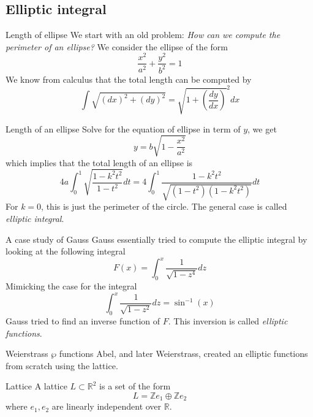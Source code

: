 \documentclass[pdf]{beamer}
\begin{document}
\subsection{Elliptic integral}
\begin{frame}{Length of ellipse}
We start with an old problem: \textit{How can we compute the perimeter of an ellipse?}
\pause
We consider the ellipse of the form 
\[\dfrac{x^2}{a^2}+\dfrac{y^2}{b^2}=1\]
We know from calculus that the total length can be computed by 
\[\int\sqrt{(dx)^2+(dy)^2}= \sqrt{1+\left(\dfrac{dy}{dx}\right)}^2dx \]
\end{frame}
\begin{frame}{Length of an ellipse}
Solve for the equation of ellipse in term of $y$, we get 
\[y = b\sqrt{1-\frac{x^2}{a^2}}\]
which implies that 
the total length of an ellipse is 
\[4a \int_0^1 \sqrt{\dfrac{1-k^2t^2}{1-t^2}}dt = 4\int_0^1 \dfrac{1-k^2t^2}{\sqrt{(1-t^2)(1-k^2t^2)}}dt \] \pause%
For $k =0$, this is just the perimeter of the circle.  The general case is called \textit{elliptic integral}.
\end{frame}
\begin{frame}{A case study of Gauss}
Gauss essentially tried to compute the elliptic integral by looking at the 
following integral
\[F(x) = \displaystyle\int_0^x\dfrac{1}{\sqrt{1-z^4}}dz\]
Mimicking the case for the integral
\[ \int_0^x\dfrac{1}{\sqrt{1-z^2}}dz = \sin^{-1}(x)\]
Gauss tried to find an inverse function of $F$. This inversion is called \textit{elliptic functions}.
\end{frame} 
\begin{frame}{Weierstrass $\wp$ functions}
Abel, and later Weierstrass, created an elliptic functions from scratch using the lattice. 
\begin{block}{Lattice}
    A lattice $L \subset \mathbb{R}^2$ is a set of the form
    \[L = \mathbb{Z}e_1\oplus\mathbb{Z}e_2\]
    where $e_1,e_2$ are linearly independent over $\mathbb{R}$.
\end{block}
\end{frame}
\end{document}
